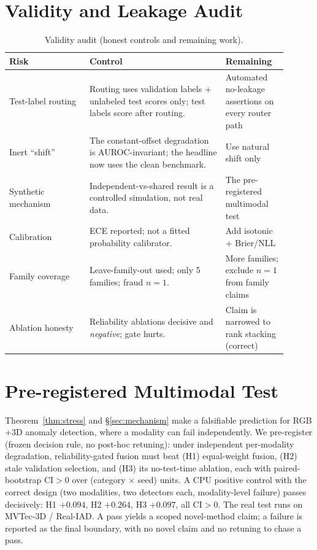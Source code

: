 \documentclass[11pt]{article}
\begin{document}
\section{Validity and Leakage Audit}\label{sec:validity}
\begin{table}[H]\centering\small
\caption{Validity audit (honest controls and remaining work).}
\begin{tabular}{L{0.26\linewidth}L{0.44\linewidth}L{0.20\linewidth}}
\toprule
\textbf{Risk} & \textbf{Control} & \textbf{Remaining} \\
\midrule
Test-label routing & Routing uses validation labels + unlabeled test scores only; test labels score after routing. & Automated no-leakage assertions on every router path \\
Inert ``shift'' & The constant-offset degradation is AUROC-invariant; the headline now uses the clean benchmark. & Use natural shift only \\
Synthetic mechanism & Independent-vs-shared result is a controlled simulation, not real data. & The pre-registered multimodal test \\
Calibration & ECE reported; not a fitted probability calibrator. & Add isotonic + Brier/NLL \\
Family coverage & Leave-family-out used; only 5 families; fraud $n{=}1$. & More families; exclude $n{=}1$ from family claims \\
Ablation honesty & Reliability ablations decisive and \emph{negative}; gate hurts. & Claim is narrowed to rank stacking (correct) \\
\bottomrule
\end{tabular}
\end{table}

\section{Pre-registered Multimodal Test}\label{sec:multimodal}
Theorem~\ref{thm:stress} and \S\ref{sec:mechanism} make a falsifiable prediction for
RGB$+$3D anomaly detection, where a modality can fail independently. We pre-register
(frozen decision rule, no post-hoc retuning): under independent per-modality
degradation, reliability-gated fusion must beat (H1) equal-weight fusion, (H2) stale
validation selection, and (H3) its no-test-time ablation, each with paired-bootstrap
CI$>0$ over (category $\times$ seed) units. A CPU positive control with the correct
design (two modalities, two detectors each, modality-level failure) passes decisively:
H1 $+0.094$, H2 $+0.264$, H3 $+0.097$, all CI$>0$. The real test runs on MVTec-3D /
Real-IAD. A pass yields a scoped novel-method claim; a failure is reported as the final
boundary, with no novel claim and no retuning to chase a pass.
\end{document}
